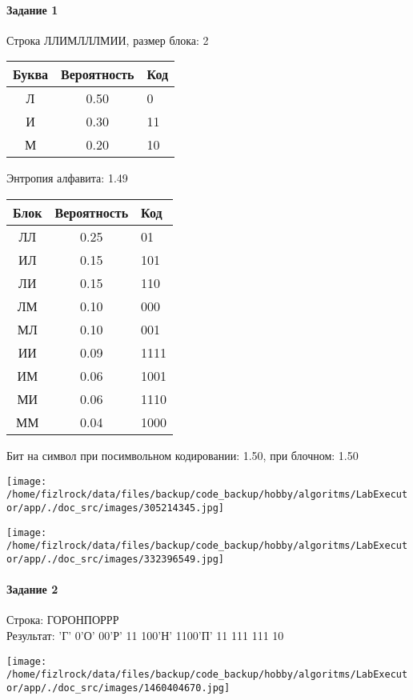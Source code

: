 \documentclass[a4paper, 12pt]{article}
\begin{document}
\paragraph{Задание 1}

Строка ЛЛИМЛЛЛМИИ, размер блока: 2
\begin{center}
 \begin{tabular}{ |c|c|l| } 
  \hline
     Буква & Вероятность & Код\\ \hline
Л & 0.50 & 0\\\hline
И & 0.30 & 11\\\hline
М & 0.20 & 10
\\ \hline \end{tabular}
\end{center}
Энтропия алфавита: 1.49
\begin{center}
 \begin{tabular}{ |c|c|l| } 
  \hline
     Блок & Вероятность & Код\\ \hline
ЛЛ & 0.25 & 01\\\hline
ИЛ & 0.15 & 101\\\hline
ЛИ & 0.15 & 110\\\hline
ЛМ & 0.10 & 000\\\hline
МЛ & 0.10 & 001\\\hline
ИИ & 0.09 & 1111\\\hline
ИМ & 0.06 & 1001\\\hline
МИ & 0.06 & 1110\\\hline
ММ & 0.04 & 1000
\\ \hline \end{tabular}
\end{center}
Бит на символ при посимвольном кодировании: 1.50, при блочном: 1.50

\texttt{[image: /home/fizlrock/data/files/backup/code\_backup/hobby/algoritms/LabExecutor/app/./doc\_src/images/305214345.jpg]}

\texttt{[image: /home/fizlrock/data/files/backup/code\_backup/hobby/algoritms/LabExecutor/app/./doc\_src/images/332396549.jpg]}
\pagebreak
\paragraph{Задание 2}

Строка: 
ГОРОНПОРРР\\
Результат: 'Г' 0'О' 00'Р' 11 100'Н' 1100'П' 11 111 111 10

\texttt{[image: /home/fizlrock/data/files/backup/code\_backup/hobby/algoritms/LabExecutor/app/./doc\_src/images/1460404670.jpg]}
\end{document}
